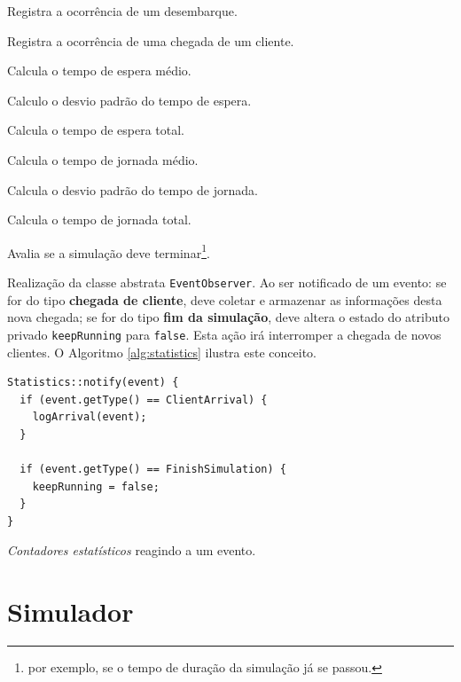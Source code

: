 \begin{description}
    \begin{description}[leftmargin=!,labelwidth=\widthof{\bfseries destinationFloor}]\setlength\itemsep{0mm}
      \item[\texttt{logDropOff}] Registra a ocorrência de um desembarque.
      \item[\texttt{logTrip}] Registra a ocorrência de uma chegada de um cliente.
      \item[\texttt{getAvgWT}] Calcula o tempo de espera médio.
      \item[\texttt{getDevWt}] Calculo o desvio padrão do tempo de espera.
      \item[\texttt{getTotalWT}] Calcula o tempo de espera total.
      \item[\texttt{getAvgWT}] Calcula o tempo de jornada médio.
      \item[\texttt{getDevWt}] Calcula o desvio padrão do tempo de jornada.
      \item[\texttt{getTotalWT}] Calcula o tempo de jornada total.
      \item[\texttt{keepRunning}] Avalia se a simulação deve terminar\footnote{por exemplo, se o tempo de duração da simulação já se passou.}.
      \item[\texttt{notify}]
        Realização da classe abstrata \texttt{EventObserver}. Ao ser notificado
        de um evento: se for do tipo \textbf{chegada de cliente}, deve coletar e
        armazenar as informações desta nova chegada; se for do tipo \textbf{fim
        da simulação}, deve altera o estado do atributo privado
        \texttt{keepRunning} para \texttt{false}. Esta ação irá interromper a
        chegada de novos clientes. O Algoritmo \ref{alg:statistics} ilustra este
        conceito.
    \end{description}

\begin{algorithm}[htb!]
  \centering
    \begin{verbatim}
Statistics::notify(event) {
  if (event.getType() == ClientArrival) {
    logArrival(event);
  }

  if (event.getType() == FinishSimulation) {
    keepRunning = false;
  }
}
    \end{verbatim}
  \caption{\label{alg:statistics}\textit{Contadores estatísticos} reagindo a um evento.}
\end{algorithm}

\end{description}

\section{\label{model:simulador}Simulador}

